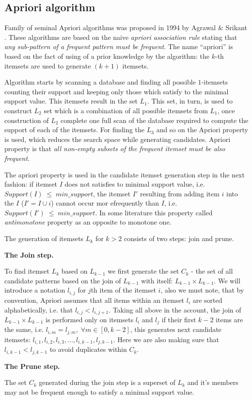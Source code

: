 \subsection{Apriori algorithm}

Family of seminal Apriori algorithms was proposed in 1994 by Agrawal \& Srikant \cite{citeulike:775528}. These algorithms are based on the naive \textit{apriori association rule} stating that \textit{any sub-pattern of a frequent pattern must be frequent}. The name ``apriori'' is based on the fact of using of a prior knowledge by the algorithm: the $k$-th itemsets are used to generate $(k+1)$ itemsets.

Algorithm starts by scanning a database and finding all possible $1$-itemsets counting their support and keeping only those which satisfy to the minimal support value. This itemsets result in the set $L_{1}$. This set, in turn, is used to construct $L_{2}$ set which is a combination of all possible itemsets from $L_{1}$, once construction of $L_{2}$ complete one full scan of the database required to compute the support of each of the itemsets. For finding the $L_{3}$ and so on the Apriori property is used, which reduces the search space while generating candidates. Apriori property is that \textit{all non-empty subsets of the frequent itemset must be also frequent}.

The apriori property is used in the candidate itemset generation step in the next fashion: if itemset $I$ does not satisfies to minimal support value, i.e. $Support(I) \; \leq \; min\_support$, the itemset $I'$ resulting from adding item $i$ into the $I$ ($I' = I \cup i$) cannot occur mor efrequently than $I$, i.e. $Support(I') \; \leq \; min\_support$. In some literature this property called \textit{antimonotone} property as an opposite to monotone one.

The generation of itemsets $L_{k}$ for $k > 2$ consists of two steps: join and prune.

\textbf{The Join step.}

To find itemset $L_{k}$ based on $L_{k-1}$ we first generate the set $C_{k}$ - the set of all candidate patterns based on the join of $L_{k-1}$ with itself: $L_{k-1} \times L_{k-1}$. We will introduce a notation $l_{i,j}$ for $j$th item of the itemset $i$, also we must note, that by convention, Apriori assumes that all items within an itemset $l_{i}$ are sorted alphabetically, i.e. that $l_{i,j} < l_{i,j+1}$. Taking all above in the account, the join of $L_{k-1} \times L_{k-1}$ is performed only on itemsets $l_{i}$ and $l_{j}$ if their first $k-2$ items are the same, i.e. $l_{i,m} = l_{j,m}, \; \forall m \in [0,k-2]$, this generates next candidate itemsets: ${l_{i,1},l_{i,2},l_{i,3},...,l_{i,k-1},l_{j,k-1}}$. Here we are also making sure that $l_{i,k-1} < l_{j,k-1}$ to avoid duplicates within $C_{k}$.

\textbf{The Prune step.}

The set $C_{k}$ generated during the join step is a superset of $L_{k}$ and it's members may not be frequent enough to satisfy a minimal support value.
